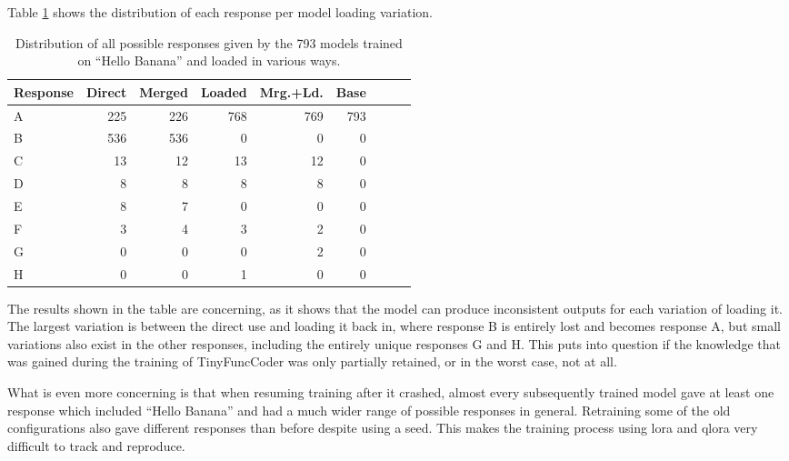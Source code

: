 Table \ref{tab:generations} shows the distribution of each response per model loading variation.
\begin{table}
    \centering
    \caption{Distribution of all possible responses given by the 793 models trained on \enquote{Hello Banana} and loaded in various ways.}
    \begin{tabular}{l|rrrrrrrr}
        \hline
        Response & Direct & Merged & Loaded & Mrg.+Ld. & Base \\
        \hline
        A & 225 & 226 & 768 & 769 & 793 \\
        B & 536 & 536 & 0 & 0 & 0 \\
        C & 13 & 12 & 13 & 12 & 0 \\
        D & 8 & 8 & 8 & 8 & 0 \\
        E & 8 & 7 & 0 & 0 & 0 \\
        F & 3 & 4 & 3 & 2 & 0 \\
        G & 0 & 0 & 0 & 2 & 0 \\
        H & 0 & 0 & 1 & 0 & 0 \\
        \hline
    \end{tabular}
    \label{tab:generations}
\end{table}

The results shown in the table are concerning, as it shows that the model can produce inconsistent outputs for each variation of loading it.
The largest variation is between the direct use and loading it back in, where response B is entirely lost and becomes response A, but small variations also exist in the other responses, including the entirely unique responses G and H.
This puts into question if the knowledge that was gained during the training of TinyFuncCoder was only partially retained, or in the worst case, not at all.

What is even more concerning is that when resuming training after it crashed, almost every subsequently trained model gave at least one response which included \enquote{Hello Banana} and had a much wider range of possible responses in general.
Retraining some of the old configurations also gave different responses than before despite using a seed.
This makes the training process using \ac{lora} and \ac{qlora} very difficult to track and reproduce.